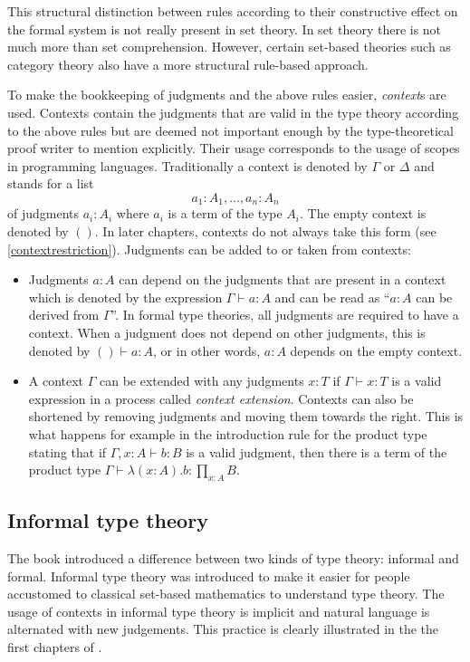\documentclass[12pt,a4paper,twoside,xetex]{book} %
\newcommand{\keyword}[1]{\emph{#1}\index{#1}}
\begin{document}
This structural distinction between rules according to their 
constructive effect on the formal system is not really present in set theory. In 
set theory there is not much more than set comprehension. However, certain 
set-based theories such as category theory also have a more structural 
rule-based approach. 

To make the bookkeeping of judgments and the above  rules easier, 
\keyword{context}s are used. Contexts contain the judgments that are valid in 
the type theory according to the above rules but are deemed not 
important enough by the type-theoretical proof writer to mention explicitly. 
Their usage corresponds to the usage of scopes in programming languages. 
Traditionally a context is denoted by $\Gamma$ or $\Delta$ and stands for a list 
$$a_1:A_1,...,a_n:A_n$$ of judgments $a_i : A_i$ where $a_i$ is a term of the type 
$A_i$.  The empty context is denoted by $()$. In later chapters, contexts do not 
always take this form (see \cref{contextrestriction}). Judgments can be added to 
or taken from contexts:

\begin{itemize}
\item Judgments $a : A$ can depend on the judgments that are present in a 
context which is denoted by the expression $\Gamma \vdash a : A$ and can be read as ``$a:A$ can be derived from $\Gamma$''. In formal 
type theories, all judgments are required to have a context. When a judgment 
does not depend on other judgments, this is denoted by $() \vdash a : A$, or 
in other words, $a : A$ depends on the empty context.  
\item A context $\Gamma$ can be extended with any judgments $x:T$ if $\Gamma 
\vdash x : T$ is a valid expression in a process called \keyword{context 
extension}. Contexts can also be shortened by removing judgments and moving them 
towards the right. This is what happens for example in the introduction rule for 
the product type stating that if $\Gamma , x : A \vdash b : B$ is a valid 
judgment, then there is a term of the product type $\Gamma \vdash \lambda (x : 
A) . b : \prod_{x : A} B$.
\end{itemize}




\subsection{Informal type theory}\label{informal}

The book \cite{Voevodsky2013} introduced a difference between two kinds of type 
theory: informal and formal. Informal type theory was introduced to make it 
easier for people accustomed to classical set-based mathematics to understand 
type theory. The usage of contexts in informal type theory is implicit and 
natural language is alternated with new judgements. This practice is clearly 
illustrated in the the first chapters of \cite{Voevodsky2013}.
\end{document}
